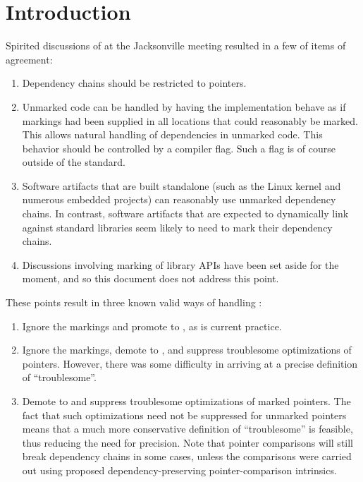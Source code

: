 \documentclass[letterpaper,twocolumn,10pt]{article}
\begin{document}
\section{Introduction}
\label{sec:Introduction}

Spirited discussions of 
at the Jacksonville meeting resulted in a few of items of agreement:

\begin{enumerate}
\item	Dependency chains should be restricted to pointers.
\item	Unmarked code can be handled by having the implementation
	behave as if markings had been supplied in all locations that
	could reasonably be marked.
	This allows natural handling of dependencies in unmarked code.
	This behavior should be controlled by a compiler flag.
	Such a flag is of course outside of the standard.
\item	Software artifacts that are built standalone (such as the Linux
	kernel and numerous embedded projects) can reasonably use
	unmarked dependency chains.
	In contrast, software artifacts that are expected to dynamically link
	against standard libraries seem likely to need to mark their
	dependency chains.
\item	Discussions involving marking of library APIs have been
	set aside for the moment, and so this document does not address
	this point.
\end{enumerate}

These points result in three known valid ways of handling
:

\begin{enumerate}
\item	Ignore the markings and promote 
	to , as is current practice.
\item	Ignore the markings, demote  to
	, and suppress troublesome
	optimizations of pointers.
	However, there was some difficulty in arriving at a precise
	definition of ``troublesome''.
\item	Demote  to 
	and suppress troublesome optimizations of marked pointers.
	The fact that such optimizations need not be suppressed
	for unmarked pointers means that a much more conservative
	definition of ``troublesome'' is feasible, thus reducing
	the need for precision.
	Note that pointer comparisons will still break dependency chains
	in some cases, unless the comparisons were carried out using
	proposed dependency-preserving pointer-comparison intrinsics.
\end{enumerate}
\end{document}

